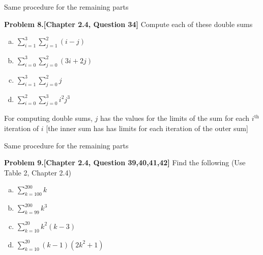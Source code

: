 \documentclass[addpoints]{exam}
\begin{document}
\begin{sloppypar}
\begin{questions}
\begin{solution}
    Same procedure for the remaining parts
\end{solution}

\question
\textbf{Problem 8.[Chapter 2.4, Question 34]}
    Compute each of these double sums
    \begin{enumerate}[(a)]
        \item $\sum_{i=1}^{3} \sum_{j=1}^{2} (i-j)$
        \item $\sum_{i=0}^{3} \sum_{j=0}^{2} (3i+2j)$
        \item $\sum_{i=1}^{3} \sum_{j=0}^{2} j$
        \item $\sum_{i=0}^{2} \sum_{j=0}^{3} i^2 j^3$
    \end{enumerate}
\begin{solution}
    
    For computing double sums, $j$ has the values for the limits of the sum for each $ i^{\text{th}} $ iteration of $i$ [the inner sum has has limits for each iteration of the outer sum]
    Same procedure for the remaining parts
\end{solution}
\newpage
\question
\textbf{Problem 9.[Chapter 2.4, Question 39,40,41,42]}
    Find the following (Use Table 2, Chapter 2.4)
    \begin{enumerate}[(a)]
        \item $\sum_{k=100}^{200} k $
        \item $\sum_{k=99}^{200} k^3$
        \item $\sum_{k=10}^{20} k^2(k-3)$
        \item $\sum_{k=10}^{20} (k-1)(2k^2+1)$
    \end{enumerate}
\begin{solution}
    

\end{solution}
\end{questions}
\end{sloppypar}
\end{document}
